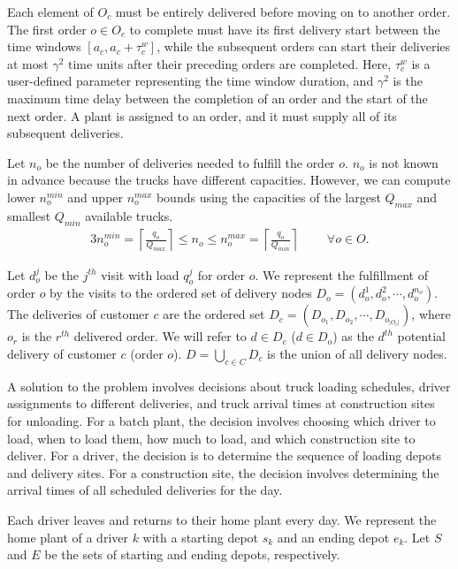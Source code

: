 \documentclass[authoryear,preprint,review,11pt]{elsarticle}
\begin{document}
Each element of $O_c$ must be entirely delivered before moving on to another order. The first order $o \in O_c$ to complete must have its first delivery start between the time windows $\left[a_c, a_c + \tau^w_c \right]$, while the subsequent orders can start their deliveries at most $\gamma^2$ time units after their preceding orders are completed. Here, $\tau^w_c$ is a user-defined parameter representing the time window duration, and $\gamma^2$ is the maximum time delay between the completion of an order and the start of the next order. A plant is assigned to an order, and it must supply all of its subsequent deliveries.

Let $n_o$ be the number of deliveries needed to fulfill the order $o$. $n_o$ is not known in advance because the trucks have different capacities. However, we can compute lower $n_o^{min}$ and upper $n_o^{max}$ bounds using the capacities of the largest $Q_{max}$ and smallest $Q_{min}$ available trucks.
\begin{alignat}{3}
    \label{mod:c0}
    n_o^{min} = \left\lceil \frac{q_o}{Q_{max}} \right\rceil \leq n_o \leq n_o^{max} = \left\lceil \frac{q_o}{Q_{min}} \right\rceil & \text{ } &
    \forall  o \in O.
\end{alignat}

Let $d^j_{o}$ be the $j^{th}$ visit with load $q^j_{o}$ for order $o$. We represent the fulfillment of order $o$ by the visits to the ordered set of delivery nodes $D_o= \left(d^1_{o},d^2_{o},\cdots, d^{n_o}_{o}\right)$. The deliveries of customer $c$ are the ordered set $D_c= (D_{o_1}, D_{o_2},\cdots,D_{o_{|O_c|}})$, where $o_r$ is the $r^{th}$ delivered order. We will refer to $d \in D_c$ ($d \in D_o$) as the $d^{th}$ potential delivery of customer $c$ (order $o$). $D=\bigcup_{c\in C} D_c$ is the union of all delivery nodes.

A solution to the problem involves decisions about truck loading schedules, driver assignments to different deliveries, and truck arrival times at construction sites for unloading. For a batch plant, the decision involves choosing which driver to load, when to load them, how much to load, and which construction site to deliver. For a driver, the decision is to determine the sequence of loading depots and delivery sites. For a construction site, the decision involves determining the arrival times of all scheduled deliveries for the day.

Each driver leaves and returns to their home plant every day. We represent the home plant of a driver $k$ with a starting depot $s_k$ and an ending depot $e_k$. Let $S$ and $E$ be the sets of starting and ending depots, respectively.
\end{document}
